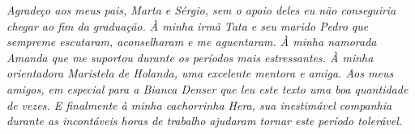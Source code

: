 \emph{Agradeço aos meus pais, Marta e Sérgio, sem o apoio deles eu não conseguiria chegar ao fim da graduação.
À minha irmã Tata e seu marido Pedro que sempreme escutaram, aconselharam e me aguentaram.
À minha namorada Amanda que me suportou durante os períodos mais estressantes.
À minha orientadora \prof[a] \dr[a] Maristela de Holanda, uma excelente mentora e amiga.
Aos meus amigos, em especial para a Bianca Denser que leu este texto uma boa quantidade de vezes.
E finalmente à minha cachorrinha Hera, sua inestimável companhia durante as incontáveis horas de trabalho
ajudaram tornar este período tolerável.}
